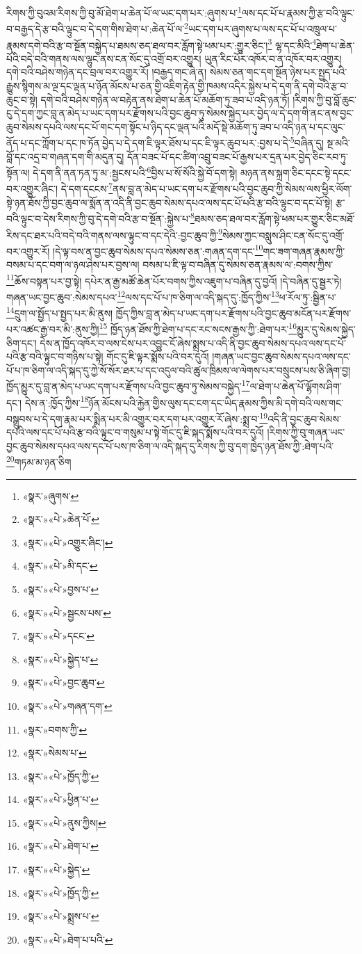 རིགས་ཀྱི་བུའམ་རིགས་ཀྱི་བུ་མོ་ཐེག་པ་ཆེན་པོ་ལ་ཡང་དག་པར་:ཞུགས་པ་\footnote{«སྣར་»ཞུགས་}ལས་དང་པོ་པ་རྣམས་ཀྱི་རྩ་བའི་ལྟུང་བ་བརྒྱད་དེ་རྩ་བའི་ལྟུང་བ་དེ་དག་གིས་ཐེག་པ་:ཆེན་པོ་ལ་\footnote{«སྣར་»«པེ་»ཆེན་པོ་}ཡང་དག་པར་ཞུགས་པ་ལས་དང་པོ་པ་འཁྲུལ་པ་རྣམས་དགེ་བའི་རྩ་བ་སྔོན་བསྐྱེད་པ་ཐམས་ཅད་ཐལ་བར་རློག་སྟེ་ཕམ་པར་:གྱུར་ཅིང་།\footnote{«སྣར་»«པེ་»འགྱུར་ཞིང་།} ལྷ་དང་མིའི་\footnote{«སྣར་»«པེ་»མི་དང་}ཐེག་པ་ཆེན་པོའི་བདེ་བའི་གནས་ལས་ལྷུང་ནས་ངན་སོང་དུ་འགྲོ་བར་འགྱུར། ཡུན་རིང་པོར་འཁོར་བ་ན་འཁོར་བར་འགྱུར། དགེ་བའི་བཤེས་གཉེན་དང་བྲལ་བར་འགྱུར་རོ། །བརྒྱད་གང་ཞེ་ན། སེམས་ཅན་གང་དག་སྔོན་ཉེས་པར་སྤྱད་པའི་རྒྱུས་སྙིགས་མ་ལྔ་དང་ལྡན་པ་ཉོན་མོངས་པ་ཅན་གྱི་འཇིག་རྟེན་གྱི་ཁམས་འདིར་སྐྱེས་པ་དེ་དག་ནི་དགེ་བའི་རྩ་བ་ཆུང་བ་སྟེ། དགེ་བའི་བཤེས་གཉེན་ལ་བརྟེན་ནས་ཐེག་པ་ཆེན་པོ་མཆོག་ཏུ་ཟབ་པ་འདི་ཉན་ཏོ། །རིགས་ཀྱི་བུ་བློ་ཆུང་ངུ་དེ་དག་ཀྱང་བླ་ན་མེད་པ་ཡང་དག་པར་རྫོགས་པའི་བྱང་ཆུབ་ཏུ་སེམས་སྐྱེད་པར་བྱེད་ལ་དེ་དག་གི་ནང་ནས་བྱང་ཆུབ་སེམས་དཔའི་ལས་དང་པོ་གང་དག་སྟོང་པ་ཉིད་དང་ལྡན་པའི་མདོ་སྡེ་མཆོག་ཏུ་ཟབ་པ་འདི་ཉན་པ་དང་ལུང་ནོད་པ་དང་ཀློག་པ་དང་ཁ་ཏོན་བྱེད་པ་དེ་དག་ཇི་ལྟར་ཐོས་པ་དང་ཇི་ལྟར་ཆུབ་པར་:བྱས་པ་དེ་\footnote{«སྣར་»«པེ་»བྱས་པ་}བཞིན་དུ། སྔ་མའི་བློ་དང་འདྲ་བ་གཞན་དག་གི་མདུན་དུ། དོན་བཟང་པོ་དང་ཚིག་འབྲུ་བཟང་པོ་རྒྱས་པར་དྲན་པར་བྱེད་ཅིང་རབ་ཏུ་སྟོན་ལ། དེ་དག་ནི་ནན་ཏན་ཏུ་མ་:སྦྱངས་པའི་\footnote{«སྣར་»«པེ་»སྦྱངས་པས་}བྱིས་པ་སོ་སོའི་སྐྱེ་བོ་དག་སྟེ། མཉན་ནས་སྐྲག་ཅིང་དངང་སྟེ་དངང་བར་འགྱུར་ཞིང་། དེ་དག་དངངས་\footnote{«སྣར་»«པེ་»དངང་}ནས་བླ་ན་མེད་པ་ཡང་དག་པར་རྫོགས་པའི་བྱང་ཆུབ་ཀྱི་སེམས་ལས་ཕྱིར་ལོག་སྟེ་ཉན་ཐོས་ཀྱི་བྱང་ཆུབ་ལ་སྨོན་ན་འདི་ནི་བྱང་ཆུབ་སེམས་དཔའ་ལས་དང་པོ་པའི་རྩ་བའི་ལྟུང་བ་དང་པོ་སྟེ། རྩ་བའི་ལྟུང་བ་དེས་རིགས་ཀྱི་བུ་དེ་དགེ་བའི་རྩ་བ་སྔོན་:སྐྱེས་པ་\footnote{«སྣར་»«པེ་»སྐྱེད་པ་}ཐམས་ཅད་ཐལ་བར་རློག་སྟེ་ཕམ་པར་གྱུར་ཅིང་མཐོ་རིས་དང་ཐར་པའི་བདེ་བའི་གནས་ལས་ལྟུང་བ་དང་དེའི་:བྱང་ཆུབ་ཀྱི་\footnote{«སྣར་»«པེ་»བྱང་ཆུབ་}སེམས་ཀྱང་བསླུས་ཤིང་ངན་སོང་དུ་འགྲོ་བར་འགྱུར་རོ། །དེ་ལྟ་བས་ན་བྱང་ཆུབ་སེམས་དཔའ་སེམས་ཅན་:གཞན་དག་དང་\footnote{«སྣར་»«པེ་»གཞན་དག་}གང་ཟག་གཞན་རྣམས་ཀྱི་བསམ་པ་དང་བག་ལ་ཉལ་ཤེས་པར་བྱས་ལ། བསམ་པ་ཇི་ལྟ་བ་བཞིན་དུ་སེམས་ཅན་རྣམས་ལ་:བགས་ཀྱིས་\footnote{«སྣར་»བགས་ཀྱི་}ཆོས་བསྟན་པར་བྱ་སྟེ། དཔེར་ན་རྒྱ་མཚོ་ཆེན་པོར་བགས་ཀྱིས་འཇུག་པ་བཞིན་དུ་བྱའོ། །དེ་བཞིན་དུ་སྦྱར་ཏེ། གཞན་ཡང་བྱང་ཆུབ་:སེམས་དཔའ་\footnote{«སྣར་»སེམས་པ་}ལས་དང་པོ་པ་ཁ་ཅིག་ལ་འདི་སྐད་དུ་:ཁྱོད་ཀྱིས་\footnote{«སྣར་»«པེ་»ཁྱོད་ཀྱི་}ཕ་རོལ་ཏུ་:སྦྱིན་པ་\footnote{«སྣར་»«པེ་»ཕྱིན་པ་}དྲུག་ལ་སྤྱོད་པ་སྤྱད་པར་མི་ནུས། ཁྱོད་ཀྱིས་བླ་ན་མེད་པ་ཡང་དག་པར་རྫོགས་པའི་བྱང་ཆུབ་མངོན་པར་རྫོགས་པར་འཚང་རྒྱ་བར་མི་:ནུས་ཀྱི།\footnote{«སྣར་»«པེ་»ནུས་ཀྱིས།} ཁྱོད་ཉན་ཐོས་ཀྱི་ཐེག་པ་དང་རང་སངས་རྒྱས་ཀྱི་:ཐེག་པར་\footnote{«སྣར་»«པེ་»ཐེག་པ་}མྱུར་དུ་སེམས་སྐྱེད་ཅིག་དང་། དེས་ན་ཁྱོད་འཁོར་བ་ལས་ངེས་པར་འབྱུང་ངོ་ཞེས་སྨྲས་པ་འདི་ནི་བྱང་ཆུབ་སེམས་དཔའ་ལས་དང་པོ་པའི་རྩ་བའི་ལྟུང་བ་གཉིས་པ་སྟེ། གོང་དུ་ཇི་ལྟར་སྨོས་པའི་བར་དུའོ། །གཞན་ཡང་བྱང་ཆུབ་སེམས་དཔའ་ལས་དང་པོ་པ་ཁ་ཅིག་ལ་འདི་སྐད་དུ་ཀྱེ་སོ་སོར་ཐར་པ་དང་འདུལ་བའི་ཚུལ་ཁྲིམས་ལ་ལེགས་པར་བསྲུངས་པས་ཅི་ཞིག་བྱ། ཁྱོད་མྱུར་དུ་བླ་ན་མེད་པ་ཡང་དག་པར་རྫོགས་པའི་བྱང་ཆུབ་ཏུ་སེམས་བསྐྱེད་\footnote{«སྣར་»«པེ་»སྐྱེད་}ལ་ཐེག་པ་ཆེན་པོ་ལྷོགས་ཤིག་དང་། དེས་ན་:ཁྱོད་ཀྱིས་\footnote{«སྣར་»«པེ་»ཁྱོད་ཀྱི་}ཉོན་མོངས་པའི་རྐྱེན་གྱིས་ལུས་དང་ངག་དང་ཡིད་རྣམས་ཀྱིས་མི་དགེ་བའི་ལས་གང་བསྒྲུབས་པ་དེ་དག་རྣམ་པར་སྨིན་པར་མི་འགྱུར་བར་དག་པར་འགྱུར་རོ་ཞེས་:སྨྲ་བ་\footnote{«སྣར་»«པེ་»སྨྲས་པ་}འདི་ནི་བྱང་ཆུབ་སེམས་དཔའི་ལས་དང་པོ་པའི་རྩ་བའི་ལྟུང་བ་གསུམ་པ་སྟེ་གོང་དུ་ཇི་སྐད་སྨོས་པའི་བར་དུའོ། །རིགས་ཀྱི་བུ་གཞན་ཡང་བྱང་ཆུབ་སེམས་དཔའ་ལས་དང་པོ་པས་ཁ་ཅིག་ལ་འདི་སྐད་དུ་རིགས་ཀྱི་བུ་དག་ཁྱེད་ཉན་ཐོས་ཀྱི་:ཐེག་པའི་\footnote{«སྣར་»«པེ་»ཐེག་པ་པའི་}གཏམ་མ་ཉན་ཅིག 
